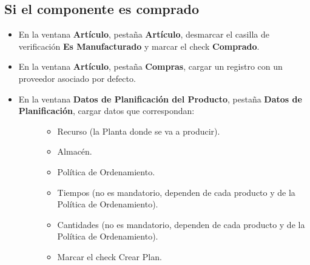 \documentclass[letterpaper,10pt,spanish]{sphinxmanual}
\begin{document}
\subsection{Si el componente es comprado}
\label{manufactura-checklist:si-el-componente-es-comprado}\begin{itemize}
\item {} 
En la ventana \textbf{Artículo}, pestaña \textbf{Artículo}, desmarcar el casilla de verificación \textbf{Es Manufacturado} y marcar el check \textbf{Comprado}.

\item {} 
En la ventana \textbf{Artículo}, pestaña \textbf{Compras}, cargar un registro con un proveedor asociado por defecto.

\item {} \begin{description}
\item[{En la ventana \textbf{Datos de Planificación del Producto}, pestaña \textbf{Datos de Planificación}, cargar datos que correspondan:}] \leavevmode\begin{itemize}
\item {} 
Recurso (la Planta donde se va a producir).

\item {} 
Almacén.

\item {} 
Política de Ordenamiento.

\item {} 
Tiempos (no es mandatorio, dependen de cada producto y de la Política de Ordenamiento).

\item {} 
Cantidades (no es mandatorio, dependen de cada producto y de la Política de Ordenamiento).

\item {} 
Marcar el check Crear Plan.

\end{itemize}

\end{description}

\end{itemize}
\end{document}
